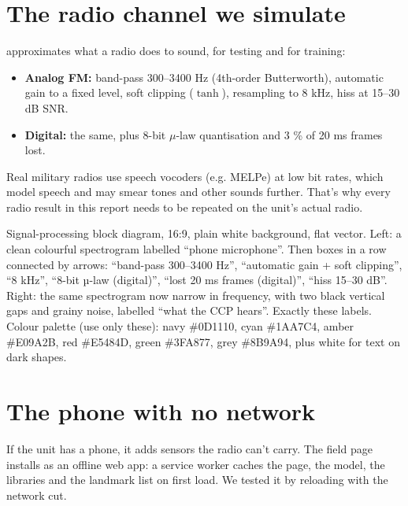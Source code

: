 \section{The radio channel we simulate}

 approximates what a radio does to sound, for testing and for training:
\begin{itemize}
  \item \textbf{Analog FM:} band-pass 300--3400 Hz (4th-order Butterworth), automatic gain to a fixed level, soft clipping
        ($\tanh$), resampling to 8 kHz, hiss at 15--30 dB SNR.
  \item \textbf{Digital:} the same, plus 8-bit $\mu$-law quantisation and 3 \% of 20 ms frames lost.
\end{itemize}
Real military radios use speech vocoders (e.g. MELPe) at low bit rates, which model speech and may smear tones and other
sounds further. That's why every radio result in this report needs to be repeated on the unit's actual radio.

{Signal-processing block diagram, 16:9, plain white background, flat vector. Left: a clean colourful spectrogram labelled ``phone
microphone''. Then boxes in a row connected by arrows: ``band-pass 300–3400 Hz'', ``automatic gain + soft clipping'',
``8 kHz'', ``8-bit µ-law (digital)'', ``lost 20 ms frames (digital)'', ``hiss 15–30 dB''. Right: the same spectrogram now narrow
in frequency, with two black vertical gaps and grainy noise, labelled ``what the CCP hears''. Exactly these labels. Colour palette (use only these): navy \#0D1110, cyan \#1AA7C4, amber \#E09A2B, red \#E5484D, green \#3FA877, grey \#8B9A94, plus white for text on dark shapes.}

\section{The phone with no network}

If the unit has a phone, it adds sensors the radio can't carry. The field page installs as an offline web app: a service
worker caches the page, the model, the libraries and the landmark list on first load. We tested it by reloading with the
network cut.

